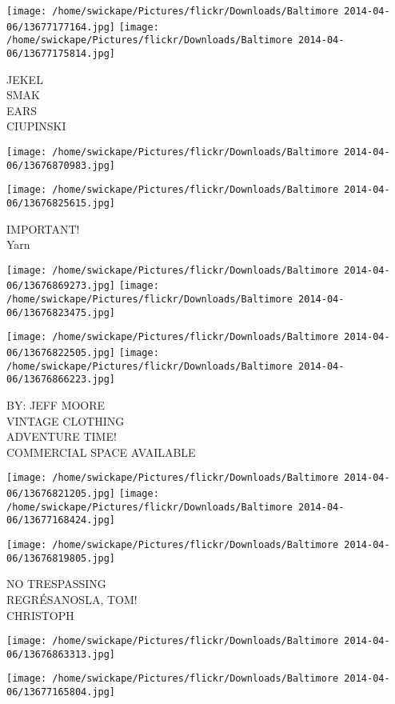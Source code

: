 \documentclass[10pt,letterpaper]{article}
\begin{document}
\texttt{[image: /home/swickape/Pictures/flickr/Downloads/Baltimore 2014-04-06/13677177164.jpg]}
\texttt{[image: /home/swickape/Pictures/flickr/Downloads/Baltimore 2014-04-06/13677175814.jpg]}

JEKEL\\
SMAK\\
EARS\\
CIUPINSKI
\pagebreak

\texttt{[image: /home/swickape/Pictures/flickr/Downloads/Baltimore 2014-04-06/13676870983.jpg]}

\vspace{0.25in}
\texttt{[image: /home/swickape/Pictures/flickr/Downloads/Baltimore 2014-04-06/13676825615.jpg]}

IMPORTANT!\\
Yarn
\pagebreak

\texttt{[image: /home/swickape/Pictures/flickr/Downloads/Baltimore 2014-04-06/13676869273.jpg]}
\texttt{[image: /home/swickape/Pictures/flickr/Downloads/Baltimore 2014-04-06/13676823475.jpg]}

\texttt{[image: /home/swickape/Pictures/flickr/Downloads/Baltimore 2014-04-06/13676822505.jpg]}
\texttt{[image: /home/swickape/Pictures/flickr/Downloads/Baltimore 2014-04-06/13676866223.jpg]}

BY: JEFF MOORE\\
VINTAGE CLOTHING\\
ADVENTURE TIME!\\
COMMERCIAL SPACE AVAILABLE
\pagebreak

\texttt{[image: /home/swickape/Pictures/flickr/Downloads/Baltimore 2014-04-06/13676821205.jpg]}
\texttt{[image: /home/swickape/Pictures/flickr/Downloads/Baltimore 2014-04-06/13677168424.jpg]}

\texttt{[image: /home/swickape/Pictures/flickr/Downloads/Baltimore 2014-04-06/13676819805.jpg]}

NO TRESPASSING\\
REGRÉSANOSLA, TOM!\\
CHRISTOPH
\pagebreak

\texttt{[image: /home/swickape/Pictures/flickr/Downloads/Baltimore 2014-04-06/13676863313.jpg]}

\vspace{0.25in}
\texttt{[image: /home/swickape/Pictures/flickr/Downloads/Baltimore 2014-04-06/13677165804.jpg]}
\end{document}
